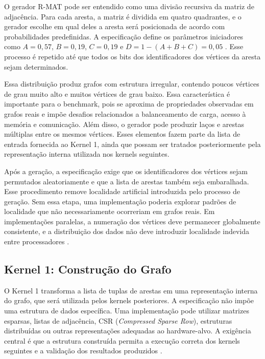 O gerador R-MAT pode ser entendido como uma divisão recursiva da matriz de adjacência. Para cada aresta, a matriz é dividida em quatro quadrantes, e o gerador escolhe em qual deles a aresta será posicionada de acordo com probabilidades predefinidas. A especificação define os parâmetros iniciadores como $A = 0{,}57$, $B = 0{,}19$, $C = 0{,}19$ e $D = 1 - (A+B+C) = 0{,}05$ \cite{graph500spec}. 
Esse processo é repetido até que todos os bits dos identificadores dos vértices da aresta sejam determinados.

Essa distribuição produz grafos com estrutura irregular, contendo poucos vértices de grau muito alto e muitos vértices de grau baixo. 
Essa característica é importante para o benchmark, pois se aproxima de propriedades observadas em grafos reais e impõe desafios relacionados a balanceamento de carga, acesso à memória e comunicação. Além disso, o gerador pode produzir laços e arestas múltiplas entre os mesmos vértices. Esses elementos fazem parte da lista de entrada fornecida ao Kernel 1, ainda que possam ser tratados posteriormente pela representação interna utilizada nos kernels seguintes.

Após a geração, a especificação exige que os identificadores dos vértices sejam permutados aleatoriamente e que a lista de arestas também seja embaralhada. Esse procedimento remove localidade artificial introduzida pelo processo de geração. Sem essa etapa, uma implementação poderia explorar padrões de localidade que não necessariamente ocorreriam em grafos reais. Em implementações paralelas, a numeração dos vértices deve permanecer globalmente consistente, e a distribuição dos dados não deve introduzir localidade indevida entre processadores \cite{graph500spec}.

\subsection{Kernel 1: Construção do Grafo}
\label{sec:graph500-kernel1}

O Kernel 1 transforma a lista de tuplas de arestas em uma representação interna do grafo, que será utilizada pelos kernels posteriores. A especificação não impõe uma estrutura de dados específica. Uma implementação pode utilizar matrizes esparsas, listas de adjacência, CSR (\textit{Compressed Sparse Row}), estruturas distribuídas ou outras representações adequadas ao hardware-alvo. 
A exigência central é que a estrutura construída permita a execução correta dos kernels seguintes e a validação dos resultados produzidos \cite{graph500spec}.

